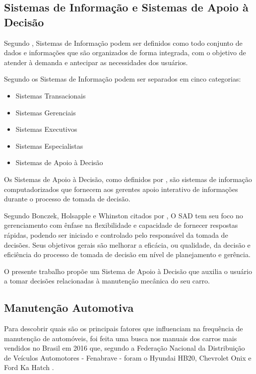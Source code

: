 \documentclass[12pt]{article}
\begin{document}
\subsection{Sistemas de Informação e Sistemas de Apoio à Decisão}\label{sec:sisad}
Segundo , Sistemas de Informação podem ser definidos
como todo conjunto de dados e informações que são organizados de forma
integrada, com o objetivo de atender à demanda e antecipar as necessidades dos
usuários.

Segundo  os Sistemas de Informação podem ser
separados em cinco categorias:

\begin{itemize}
    \item Sistemas Transacionais
    \item Sistemas Gerenciais
    \item Sistemas Executivos
    \item Sistemas Especialistas
    \item Sistemas de Apoio à Decisão
\end{itemize}

Os Sistemas de Apoio à Decisão, como definidos por ,
são sistemas de informação computadorizados que fornecem aos gerentes apoio
interativo de informações durante o processo de tomada de decisão.

Segundo Bonczek, Holsapple e Whinston citados por ,
O SAD tem seu foco no gerenciamento com ênfase na flexibilidade e capacidade de
fornecer respostas rápidas, podendo ser iniciado e controlado pelo responsável
da tomada de decisões. Seus objetivos gerais são melhorar a eficácia, ou
qualidade, da decisão e eficiência do processo de tomada de decisão em nível de
planejamento e gerência.

O presente trabalho propõe um Sistema de Apoio à Decisão que auxilia o usuário
a tomar decisões relacionadas à manutenção mecânica do seu carro.

\subsection{Manutenção Automotiva}\label{sec:manutencao}
Para descobrir quais são os principais fatores que influenciam na frequência de
manutenção de automóveis, foi feita uma busca nos manuais dos carros mais vendidos
no Brasil em 2016 que, segundo a Federação Nacional da Distribuição de Veículos
Automotores - Fenabrave - foram o Hyundai HB20, Chevrolet Onix e Ford Ka Hatch
\cite{fenabrave}.
\end{document}
